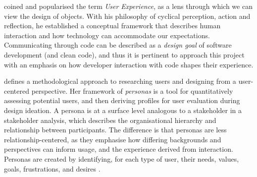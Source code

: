 \documentclass[../report.tex]{subfiles}
\begin{document}
\cite{norman2013design} coined and popularised the term \textit{User Experience}, as a lens through which we can view the design of objects. With his philosophy of cyclical perception, action and reflection, he established a conceptual framework that describes human interaction and how technology can accommodate our expectations. Communicating through code can be described as a \textit{design goal} of software development (and clean code), and thus it is pertinent to approach this project with an emphasis on how developer interaction with code shapes their experience.

\cite{buley2013user} defines a methodological approach to researching users and designing from a user-centered perspective. Her framework of \textit{personas} is a tool for quantitatively assessing potential users, and then deriving profiles for user evaluation during design ideation. A persona is at a surface level analogous to a stakeholder in a stakeholder analysis, which describes the organisational hierarchy and relationship between participants. The difference is that personas are less relationship-centered, as they emphasise how differing backgrounds and perspectives can inform usage, and the experience derived from interaction. Personas are created by identifying, for each type of user, their needs, values, goals, frustrations, and desires \cite[p. 132]{buley2013user}. \\
\end{document}
